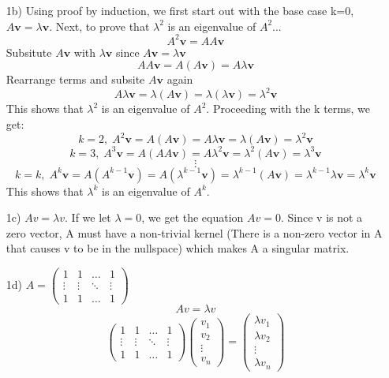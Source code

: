 \documentclass{article}
\begin{document}
\begin{enumerate}
    \item[1b)] Using proof by induction, we first start out with the base case k=0, $A\textbf{v} = \lambda\textbf{v}$. 
    Next, to prove that $\lambda^2$ is an eigenvalue of $A^2$...
                $$A^2\textbf{v} = AA\textbf{v}$$
                Subsitute $A\textbf{v}$ with $\lambda \textbf{v}$ since $A\textbf{v} = \lambda\textbf{v}$
                $$AA\textbf{v} = A(A\textbf{v}) = A\lambda\textbf{v}$$
                Rearrange terms and subsite $A\textbf{v}$ again 
                $$A\lambda\textbf{v} = \lambda(A\textbf{v}) = \lambda(\lambda\textbf{v}) = \lambda^2\textbf{v}$$
    This shows that $\lambda ^2$ is an eigenvalue of $A^2$. Proceeding with the k terms, we get:
    $$k = 2, \;A^2\textbf{v} = A(A\textbf{v}) = A\lambda \textbf{v} = \lambda(A\textbf{v}) = \lambda^2\textbf{v}$$
    $$k = 3, \;A^3\textbf{v} = A(AA\textbf{v}) = A\lambda^2 \textbf{v} = \lambda^2(A\textbf{v}) = \lambda^3\textbf{v}$$
    $$\vdots$$
    $$k = k, \;A^k\textbf{v} = A(A^{k-1}\textbf{v}) = A(\lambda^{k-1} \textbf{v}) = \lambda^{k-1}(A\textbf{v}) = \lambda^{k-1}\lambda\textbf{v} = \lambda^k\textbf{v}$$
    This shows that $\lambda ^k$ is an eigenvalue of $A^k$. 
    \item[1c)] $Av = \lambda v$. If we let $\lambda = 0$, we get the equation $Av = 0$. Since v is not a zero vector, A must have a non-trivial kernel (There is a non-zero vector in A that causes v to be in the nullspace) which makes A a singular matrix.
    \item[1d)] $A = \begin{pmatrix}1 & 1 & \dots & 1 \\ \vdots & \vdots & \ddots &\vdots \\ 1 & 1 & \dots & 1\end{pmatrix}$
                $$Av = \lambda v$$
                $$
                    \begin{pmatrix}1 & 1 & \dots & 1 \\ \vdots & \vdots & \ddots &\vdots \\ 1 & 1 & \dots & 1\end{pmatrix}
                    \begin{pmatrix}v_1 \\ v_2 \\ \vdots \\ v_n\end{pmatrix}
                    =
                    \begin{pmatrix}\lambda v_1 \\ \lambda v_2 \\ \vdots \\ \lambda v_n\end{pmatrix} 
$$
\end{enumerate}
\end{document}
